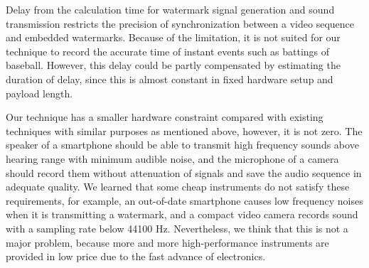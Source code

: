 Delay from the calculation time for watermark signal generation and sound transmission restricts the precision of synchronization between a video sequence and embedded watermarks.
Because of the limitation, it is not suited for our technique to record the accurate time of instant events such as battings of baseball.
However, this delay could be partly compensated by estimating the duration of delay, since this is almost constant in fixed hardware setup and payload length.

Our technique has a smaller hardware constraint compared with existing techniques with similar purposes as mentioned above, however, it is not zero.
The speaker of a smartphone should be able to transmit high frequency sounds above hearing range with minimum audible noise, and the microphone of a camera should record them without attenuation of signals and save the audio sequence in adequate quality.
We learned that some cheap instruments do not satisfy these requirements, for example, an out-of-date smartphone causes low frequency noises when it is transmitting a watermark, and a compact video camera records sound with a sampling rate below 44100 Hz.
Nevertheless, we think that this is not a major problem, because more and more high-performance instruments are provided in low price due to the fast advance of electronics.
